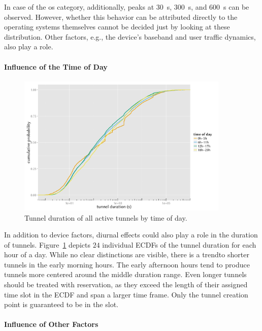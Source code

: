 In case of the \gls{os} category, additionally, peaks at \SI{30}{\second}, \SI{300}{\second}, and \SI{600}{\second} can be observed. However, whether this behavior can be attributed directly to the operating systems themselves cannot be decided just by looking at these distribution. Other factors, e.g., the device's baseband and user traffic dynamics, also play a role. 


\paragraph{Influence of the Time of Day}

\begin{figure}[htb]
	\centering
	\includegraphics[width=0.9\textwidth]{images/R-duration-timeofday-ecdf.pdf}
	\caption{Tunnel duration of all active tunnels by time of day.}
\label{c4:fig:duration-timeofday-ecdf}
\end{figure}

In addition to device factors, diurnal effects could also play a role in the duration of tunnels. Figure~\ref{c4:fig:duration-timeofday-ecdf} depicts $24$ individual \glspl{ECDF} of the tunnel duration for each hour of a day. While no clear distinctions are visible, there is a trendto shorter tunnels in the early morning hours. The early afternoon hours tend to produce tunnels more centered around the middle duration range. Even longer tunnels should be treated with reservation, as they exceed the length of their assigned time slot in the \gls{ECDF} and span a larger time frame. Only the tunnel creation point is guaranteed to be in the slot.


\paragraph{Influence of Other Factors}

